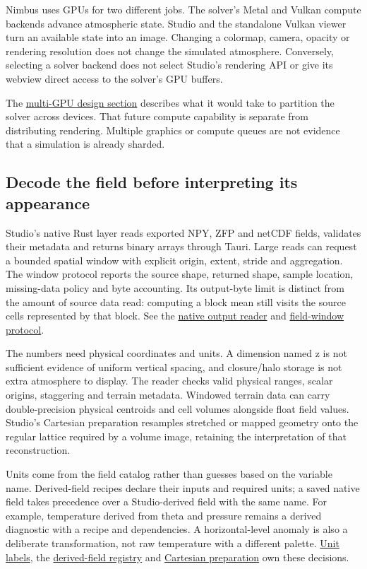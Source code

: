 \documentclass[
  11pt,
]{article}
\begin{document}
Nimbus uses GPUs for two different jobs. The solver's Metal and Vulkan
compute backends advance atmospheric state. Studio and the standalone
Vulkan viewer turn an available state into an image. Changing a
colormap, camera, opacity or rendering resolution does not change the
simulated atmosphere. Conversely, selecting a solver backend does not
select Studio's rendering API or give its webview direct access to the
solver's GPU buffers.

The \hyperref[architecture-multigpu]{multi-GPU design section} describes what
it would take to partition the solver across devices. That future compute
capability is separate from distributing rendering. Multiple graphics or
compute queues are not evidence that a simulation is already sharded.



\subsection{Decode the field before interpreting its
appearance}\label{decode-the-field-before-interpreting-its-appearance}

Studio's native Rust layer reads exported NPY, ZFP and netCDF fields,
validates their metadata and returns binary arrays through Tauri. Large
reads can request a bounded spatial window with explicit origin, extent,
stride and aggregation. The window protocol reports the source shape,
returned shape, sample location, missing-data policy and byte
accounting. Its output-byte limit is distinct from the amount of source
data read: computing a block mean still visits the source cells
represented by that block. See the
\href{../ui/src-tauri/src/commands/outputs.rs}{native output reader} and
\href{../ui/src/lib/dataset/nativeFieldWindow.ts}{field-window
protocol}.

The numbers need physical coordinates and units. A dimension named z is
not sufficient evidence of uniform vertical spacing, and closure/halo
storage is not extra atmosphere to display. The reader checks valid
physical ranges, scalar origins, staggering and terrain metadata.
Windowed terrain data can carry double-precision physical centroids and
cell volumes alongside float field values. Studio's Cartesian
preparation resamples stretched or mapped geometry onto the regular
lattice required by a volume image, retaining the interpretation of that
reconstruction.

Units come from the field catalog rather than guesses based on the
variable name. Derived-field recipes declare their inputs and required
units; a saved native field takes precedence over a Studio-derived field
with the same name. For example, temperature derived from theta and
pressure remains a derived diagnostic with a recipe and dependencies. A
horizontal-level anomaly is also a deliberate transformation, not raw
temperature with a different palette.
\href{../ui/src/lib/science/fieldUnits.ts}{Unit labels}, the
\href{../ui/src/lib/derived/derivedFieldRegistry.ts}{derived-field
registry} and \href{../ui/src/lib/science/cartesianInterp.ts}{Cartesian
preparation} own these decisions.
\end{document}
